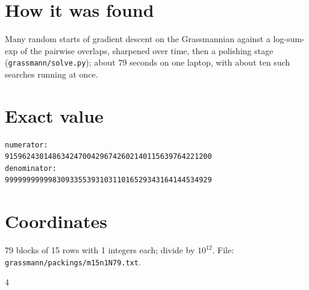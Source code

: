 \documentclass[11pt,a4paper]{article}
\begin{document}
\section{How it was found}
Many random starts of gradient descent on the Grassmannian against a log-sum-exp of the pairwise overlaps, sharpened over time, then a polishing stage (\texttt{grassmann/solve.py}); about 79 seconds on one laptop, with about ten such searches running at once.


\appendix
\section{Exact value}
{\small
\begin{verbatim}
numerator:
915962430148634247004296742602140115639764221200
denominator:
999999999998309335539310311016529343164144534929
\end{verbatim}}

\section{Coordinates}
79 blocks of 15 rows with 1 integers each; divide by $10^{12}$. File: \texttt{grassmann/packings/m15n1N79.txt}.
{\tiny
\begin{multicols}{4}
\end{multicols}}
\end{document}
